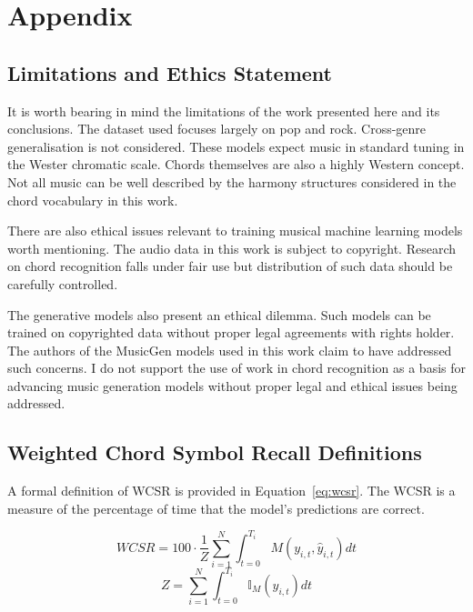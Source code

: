 \appendix

\chapter{Appendix}

\section{Limitations and Ethics Statement}\label{app:limitations_and_ethics}

It is worth bearing in mind the limitations of the work presented here and its conclusions. The dataset used focuses largely on pop and rock. Cross-genre generalisation is not considered. These models expect music in standard tuning in the Wester chromatic scale. Chords themselves are also a highly Western concept. Not all music can be well described by the harmony structures considered in the chord vocabulary in this work. 

There are also ethical issues relevant to training musical machine learning models worth mentioning. The audio data in this work is subject to copyright. Research on chord recognition falls under fair use but distribution of such data should be carefully controlled. 

The generative models also present an ethical dilemma. Such models can be trained on copyrighted data without proper legal agreements with rights holder. The authors of the MusicGen models used in this work claim to have addressed such concerns. I do not support the use of work in chord recognition as a basis for advancing music generation models without proper legal and ethical issues being addressed.

\section{Weighted Chord Symbol Recall Definitions}\label{app:weighted_chord_symbol_recall_definitions}

A formal definition of WCSR is provided in Equation~\ref{eq:wcsr}. The WCSR is a measure of the percentage of time that the model's predictions are correct.

\begin{equation}\label{eq:wcsr}
    WCSR = 100\cdot\frac{1}{Z}\sum_{i=1}^{N} \int_{t=0}^{T_i} M(y_{i,t},\hat{y}_{i,t}) dt
\end{equation}
\begin{equation}
    Z = \sum_{i=1}^{N} \int_{t=0}^{T_i} \mathbb{I}_M(y_{i,t}) dt
\end{equation}

